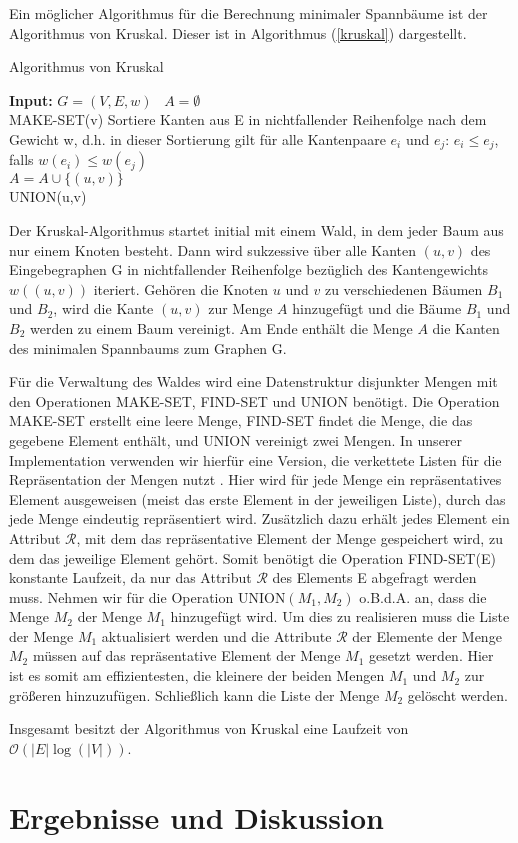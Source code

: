 \documentclass[a4paper,10pt]{article}
\begin{document}
Ein möglicher Algorithmus für die Berechnung minimaler Spannbäume ist der Algorithmus von Kruskal. Dieser ist in Algorithmus (\ref{kruskal}) dargestellt.
\begin{algorithm}
  \label{kruskal}
  \caption{Algorithmus von Kruskal}
      \textbf{Input: } $G = (V,E,w)$ \
      $A = \emptyset$ \\
      {
	  MAKE-SET(v)
      }
      Sortiere Kanten aus E in nichtfallender Reihenfolge nach dem Gewicht w, d.h. in dieser Sortierung gilt für alle Kantenpaare $e_i$ und $e_j$:
    $e_i \leq e_j$, falls $w(e_i) \leq w(e_j)$ \\
      {
	  {
	      $A = A \cup \{ (u,v) \}$ \\
	      UNION(u,v)
	  }
      }
  \hspace{1cm}
\end{algorithm}
\hspace{1cm}
Der Kruskal-Algorithmus startet initial mit einem Wald, in dem jeder Baum aus nur einem Knoten besteht. Dann wird sukzessive über alle Kanten $(u,v)$ des
Eingebegraphen G in nichtfallender Reihenfolge bezüglich des Kantengewichts $w((u,v))$
iteriert. Gehören die Knoten $u$ und $v$ zu verschiedenen Bäumen $B_1$ und $B_2$, wird die Kante
$(u,v)$ zur Menge $A$ hinzugefügt und die Bäume $B_1$ und $B_2$ werden zu einem Baum vereinigt. Am Ende enthält die Menge $A$ die Kanten des
minimalen Spannbaums zum Graphen G.

Für die Verwaltung des Waldes wird eine Datenstruktur disjunkter Mengen mit den Operationen MAKE-SET, FIND-SET und UNION benötigt. Die Operation MAKE-SET
erstellt eine leere Menge, FIND-SET findet die Menge, die das gegebene Element enthält, und UNION vereinigt zwei Mengen. In unserer Implementation
verwenden wir hierfür eine Version, die verkettete Listen für die Repräsentation der Mengen nutzt \cite[Kapitel 21.2]{cormen}. Hier wird für jede
Menge ein repräsentatives Element ausgeweisen (meist das erste Element in der jeweiligen Liste), durch das jede Menge eindeutig repräsentiert wird.
Zusätzlich dazu erhält jedes Element ein Attribut $\mathcal{R}$, mit dem das repräsentative Element der Menge gespeichert wird, zu dem das
jeweilige Element gehört.
Somit benötigt die Operation FIND-SET(E) konstante Laufzeit, da nur das Attribut $\mathcal{R}$ des Elements E abgefragt werden muss.
Nehmen wir für die Operation UNION$(M_1,M_2)$ o.B.d.A. an, dass die Menge $M_2$ der Menge $M_1$ hinzugefügt wird. Um dies zu realisieren muss die
Liste der Menge $M_1$ aktualisiert werden und die Attribute $\mathcal{R}$ der Elemente der Menge $M_2$ müssen auf das repräsentative Element der Menge
$M_1$ gesetzt werden. Hier ist es somit am effizientesten, die kleinere der beiden Mengen $M_1$ und $M_2$ zur größeren hinzuzufügen.
Schließlich kann die Liste der Menge $M_2$ gelöscht werden.

Insgesamt besitzt der Algorithmus von Kruskal eine Laufzeit von $\mathcal{O}(|E|\log(|V|))$.


\section{Ergebnisse und Diskussion}



\end{document}
